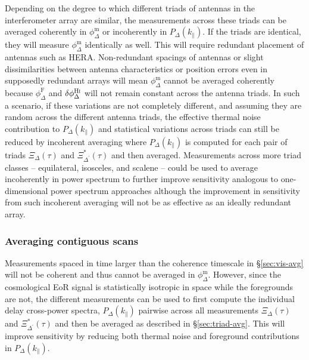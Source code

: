 \documentclass[
reprint,
superscriptaddress,
amsmath,
amssymb,
aps,
prd
]{revtex4-1}
\begin{document}
Depending on the degree to which different triads of antennas in the interferometer array are similar, the measurements across these triads can be averaged coherently in $\phi_\Delta^\textrm{m}$ or incoherently in $P_\Delta(k_\parallel)$. If the triads are identical, they will measure $\phi_\Delta^\textrm{m}$ identically as well. This will require redundant placement of antennas such as HERA. Non-redundant spacings of antennas or slight dissimilarities between antenna characteristics or position errors even in supposedly redundant arrays will mean $\phi_\Delta^\textrm{m}$ cannot be averaged coherently because $\phi_\Delta^\textrm{F}$ and $\delta\phi_\Delta^\textrm{H{\sc i}}$ will not remain constant across the antenna triads. In such a scenario, if these variations are not completely different, and assuming they are random across the different antenna triads, the effective thermal noise contribution to $P_\Delta(k_\parallel)$ and statistical variations across triads can still be reduced by incoherent averaging where $P_\Delta(k_\parallel)$ is computed for each pair of triads $\Xi_\Delta(\tau)$ and $\Xi_{\Delta^\prime}^*(\tau)$ and then averaged. Measurements across more triad classes -- equilateral, isosceles, and scalene -- could be used to average incoherently in power spectrum to further improve sensitivity analogous to one-dimensional power spectrum approaches although the improvement in sensitivity from such incoherent averaging will not be as effective as an ideally redundant array.

\subsubsection{Averaging contiguous scans}\label{sec:utc-avg}

Measurements spaced in time larger than the coherence timescale in \S\ref{sec:vis-avg} will not be coherent and thus cannot be averaged in $\phi_\Delta^\textrm{m}$. However, since the cosmological EoR signal is statistically isotropic in space while the foregrounds are not, the different measurements can be used to first compute the individual delay cross-power spectra, $P_\Delta(k_\parallel)$ pairwise across all measurements $\Xi_\Delta(\tau)$ and $\Xi_{\Delta^\prime}^*(\tau)$ and then be averaged as described in \S\ref{sec:triad-avg}. This will improve sensitivity by reducing both thermal noise and foreground contributions in $P_\Delta(k_\parallel)$. 

\end{document}
